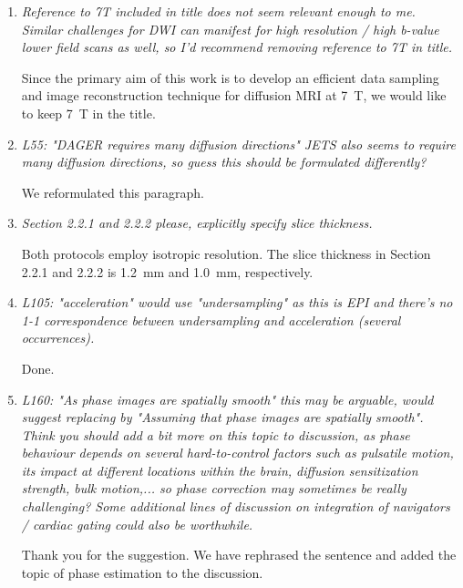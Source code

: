 \documentclass[a4paper,11pt,twoside]{report}
\begin{document}
\begin{enumerate}[resume]
    \item \textit{Reference to 7T included in title does not seem relevant enough to me. Similar challenges for DWI can manifest for high resolution / high b-value lower field scans as well, so I'd recommend removing reference to 7T in title.}

    \hspace{1em} Since the primary aim of this work is
    to develop an efficient data sampling and image reconstruction technique
    for diffusion MRI at \SI{7}{\tesla}, we would like to keep \SI{7}{\tesla} in the title.

    \item \textit{L55: "DAGER requires many diffusion directions" \textrightarrow JETS also seems to require many diffusion directions, so guess this should be formulated differently?}

    We reformulated this paragraph.

    \item \textit{Section 2.2.1 and 2.2.2 \textrightarrow please, explicitly specify slice thickness.}

    \hspace{1em} Both protocols employ isotropic resolution.
    The slice thickness in Section 2.2.1 and 2.2.2 is \SI{1.2}{mm} and \SI{1.0}{mm}, respectively.

    \item \textit{L105: "acceleration" \textrightarrow would use "undersampling" as this is EPI and there's no 1-1 correspondence between undersampling and acceleration (several occurrences).}

    \hspace{1em} Done.

    \item \textit{L160: "As phase images are spatially smooth" \textrightarrow this may be arguable, would suggest replacing by "Assuming that phase images are spatially smooth". Think you should add a bit more on this topic to discussion, as phase behaviour depends on several hard-to-control factors such as pulsatile motion, its impact at different locations within the brain, diffusion sensitization strength, bulk motion,... so phase correction may sometimes be really challenging? Some additional lines of discussion on integration of navigators / cardiac gating could also be worthwhile.}

    \hspace{1em} Thank you for the suggestion.
    We have rephrased the sentence and added the topic of phase estimation to the discussion.


\end{enumerate}
\end{document}
